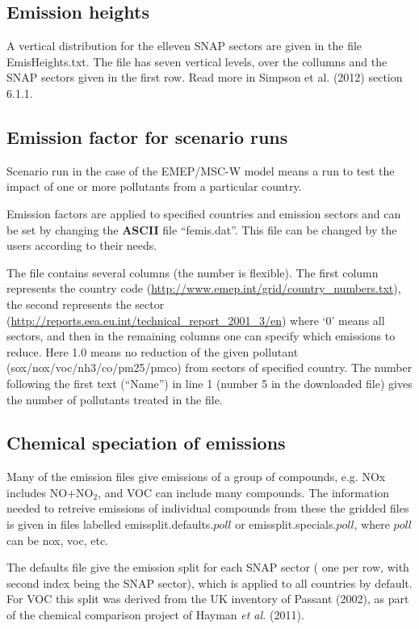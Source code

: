 
\subsection{Emission heights}
A vertical distribution for the elleven SNAP sectors are given in the file EmisHeights.txt. 
The file has seven vertical levels, over the collumns and the SNAP sectors given in the first row. 
Read more in Simpson et al. (2012) section 6.1.1.

\subsection{Emission factor for scenario runs}\label{sec:femis}
Scenario run in the case of the EMEP/MSC-W model means a run to test
the impact of one or more pollutants from a particular
country. 

Emission factors are applied to specified countries and
emission sectors and can be set by changing the {\bf ASCII} file
``femis.dat''. 
This file can be changed by the users according to their needs.

The file contains several columns (the number is flexible). The first column represents
the country code (\url{http://www.emep.int/grid/country_numbers.txt}),
the second represents the sector
(\url{http://reports.eea.eu.int/technical_report_2001_3/en}) 
where `0' means all sectors, and then in the remaining
 columns one can specify
which emissions to reduce. Here 1.0 means no reduction of the given
pollutant 
(sox/nox/voc/nh3/co/pm25/pmco) from sectors of specified country. The
number following the first text (``Name'') in line 1 (number 5 in
the downloaded file) gives the number of pollutants treated in the file.


\subsection{Chemical speciation of emissions}

Many of the emission files give emissions of a group of compounds, e.g.
NOx includes NO+NO$_2$, and VOC can include many compounds. The information
needed to retreive emissions of individual compounds from these the
gridded files is given in  files labelled emissplit.defaults.$poll$ or
emissplit.specials.$poll$, where $poll$ can be nox, voc, etc.

The defaults file give the emission split for each SNAP sector (
one per row, with second index being the SNAP sector), which
is applied to all countries by default. For VOC this split
was derived from the UK inventory of Passant (2002),
as part of the chemical comparison project of Hayman {\sl et al.} (2011).

